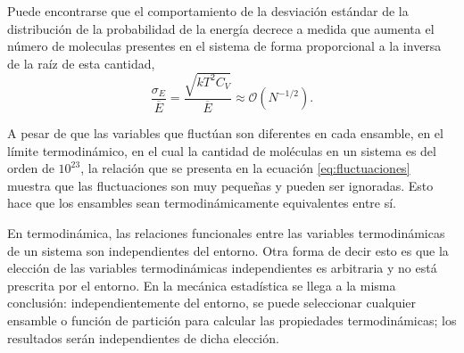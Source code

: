 
Puede encontrarse que el comportamiento de la desviación estándar de la 
distribución de la probabilidad de la energía decrece a medida que aumenta el 
número de moleculas presentes en el sistema de forma proporcional a la inversa
de la raíz de esta cantidad,
\begin{equation}\label{eq:fluctuaciones}
    \frac{\sigma_E}{\overline{E}} = \frac{\sqrt{kT^2C_V}}{\overline{E}} \approx \mathcal{O}(N^{-1/2}).
\end{equation}


A pesar de que las variables que fluctúan son diferentes en cada ensamble, en el 
límite termodinámico, en el cual la cantidad de moléculas en un sistema es 
del orden de $10^{23}$, la relación que se presenta en la ecuación 
\ref{eq:fluctuaciones} muestra que las fluctuaciones son muy pequeñas y pueden 
ser ignoradas. Esto hace que los ensambles sean termodinámicamente equivalentes 
entre sí.

En termodinámica, las relaciones funcionales entre las variables termodinámicas 
de un sistema son independientes del entorno. Otra forma de decir esto es que la 
elección de las variables termodinámicas independientes es arbitraria y no está 
prescrita por el entorno. En la mecánica estadística se llega a la misma 
conclusión: independientemente del entorno, se puede seleccionar cualquier 
ensamble o función de partición para calcular las propiedades termodinámicas; 
los resultados serán independientes de dicha elección.


